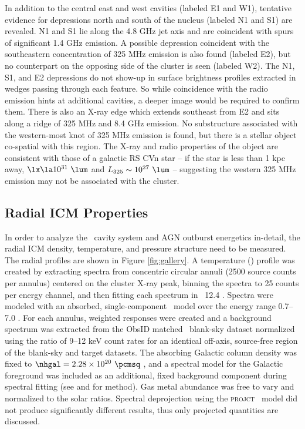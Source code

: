 \documentclass[11pt, preprint]{aastex}
\begin{document}
In addition to the central east and west cavities (labeled E1 and W1),
tentative evidence for depressions north and south of the nucleus
(labeled N1 and S1) are revealed. N1 and S1 lie along the 4.8 GHz jet
axis and are coincident with spurs of significant 1.4 GHz emission. A
possible depression coincident with the southeastern concentration of
325 MHz emission is also found (labeled E2), but no counterpart on the
opposing side of the cluster is seen (labeled W2). The N1, S1, and E2
depressions do not show-up in surface brightness profiles extracted in
wedges passing through each feature. So while coincidence with the
radio emission hints at additional cavities, a deeper image would be
required to confirm them. There is also an X-ray edge which extends
southeast from E2 and sits along a ridge of 325 MHz and 8.4 GHz
emission. No substructure associated with the western-most knot of 325
MHz emission is found, but there is a stellar object co-spatial with
this region. The X-ray and radio properties of the object are
consistent with those of a galactic RS CVn star
\citep{1993RPPh...56.1145S} -- if the star is less than 1 kpc away,
$\lx \la 10^{31} ~\lum$ and $L_{325} \sim 10^{27} ~\lum$ -- suggesting
the western 325 MHz emission may not be associated with the cluster.

\subsection{Radial ICM Properties}
\label{sec:icm}

In order to analyze the \rbs\ cavity system and AGN outburst
energetics in-detail, the radial ICM density, temperature, and
pressure structure need to be measured. The radial profiles are shown
in Figure \ref{fig:gallery}. A temperature (\tx) profile was created
by extracting spectra from concentric circular annuli (2500 source
counts per annulus) centered on the cluster X-ray peak, binning the
spectra to 25 counts per energy channel, and then fitting each
spectrum in \xspec\ 12.4 \citep{xspec}. Spectra were modeled with an
absorbed, single-component \mekal\ model \citep{mekal1} over the
energy range 0.7--7.0 \keV. For each annulus, weighted responses were
created and a background spectrum was extracted from the ObsID matched
\caldb\ blank-sky dataset normalized using the ratio of 9--12 keV
count rates for an identical off-axis, source-free region of the
blank-sky and target datasets. The absorbing Galactic column density
was fixed to $\nhgal = 2.28 \times 10^{20} ~\pcmsq$ \citep{lab}, and a
spectral model for the Galactic foreground was included as an
additional, fixed background component during spectral fitting (see
\citealt{2005ApJ...628..655V} and \citealt{xrayband} for method). Gas
metal abundance was free to vary and normalized to the \citet{ag89}
solar ratios. Spectral deprojection using the {\textsc{projct}}
\xspec\ model did not produce significantly different results, thus
only projected quantities are discussed.
\end{document}
